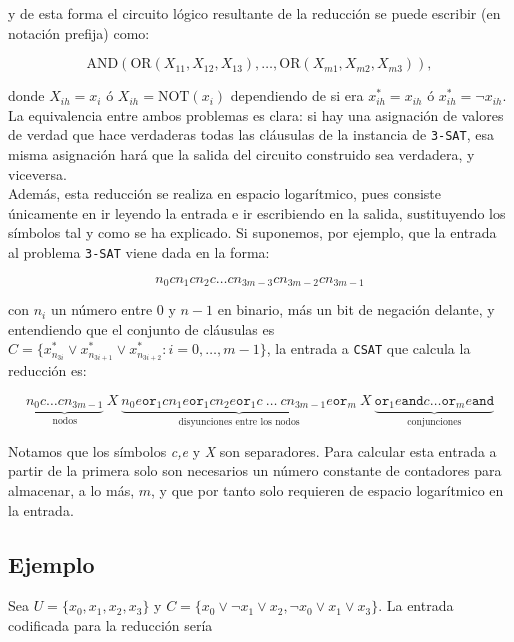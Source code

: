 \documentclass[11pt,a4paper]{article}
\newenvironment{sol}{\begin{adjustwidth}{1em}{}}{\end{adjustwidth}}
\begin{document}
\begin{sol}
y de esta forma el circuito lógico resultante de la reducción se puede escribir (en notación prefija) como:

\[
\text{AND}(\text{OR}(X_{11},X_{12},X_{13}), \dots, \text{OR}(X_{m1}, X_{m2}, X_{m3})),
\]

donde $X_{ih} = x_i$ ó $X_{ih} = \text{NOT}(x_i)$ dependiendo de si era $x^*_{ih} = x_{ih}$ ó $x_{ih}^* = \lnot x_{ih}$.\\

La equivalencia entre ambos problemas es clara: si hay una asignación de valores de verdad que hace verdaderas todas las cláusulas de la instancia de \verb|3-SAT|, esa misma asignación hará que la salida del circuito construido sea verdadera, y viceversa.\\

Además, esta reducción se realiza en espacio logarítmico, pues consiste únicamente en ir leyendo la entrada e ir escribiendo en la salida, sustituyendo los símbolos tal y como se ha explicado. Si suponemos, por ejemplo, que la entrada al problema \verb|3-SAT| viene dada en la forma:

\[
  n_{0} c n_{1} c n_{2} c \dots c n_{3m-3} c n_{3m-2} c n_{3m-1}
\]

con $n_{i}$ un número entre 0 y $n-1$ en binario, más un bit de negación delante, y entendiendo que el conjunto de cláusulas es $C = \{ x^*_{n_{3i}}\lor x^*_{n_{3i+1}} \lor x^*_{n_{3i+2}} : i=0,\dots,m-1 \}$, la entrada a \verb|CSAT| que calcula la reducción es:

\[
  \underbrace{n_{0}c\dots cn_{3m-1}}_\text{nodos}\ X\ \underbrace{n_{0}e\texttt{or}_{1}cn_{1}e\texttt{or}_{1}cn_{2}e\texttt{or}_{1}c\ \dots\ cn_{3m-1}e\texttt{or}_{m}}_\text{disyunciones entre los nodos}\ X \ \underbrace{\texttt{or}_{1}e\texttt{and}c\dots \texttt{or}_{m}e\texttt{and}}_\text{conjunciones}
\]

Notamos que los símbolos \textit{c,e} y \textit{X} son separadores. Para calcular esta entrada a partir de la primera solo son necesarios un número constante de contadores para almacenar, a lo más, $m$, y que por tanto solo requieren de espacio logarítmico en la entrada.

\subsection*{Ejemplo}

Sea $U = \{x_0,x_1,x_2,x_3\}$ y $C = \{ x_0 \lor \lnot x_1 \lor x_2, \lnot x_0 \lor x_1 \lor x_3 \}$. La entrada codificada para la reducción sería


\end{sol}
\end{document}
